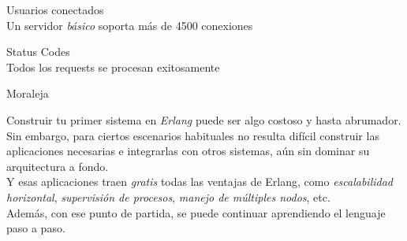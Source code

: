 \documentclass[utf8,hyperref={colorlinks=true}]{beamer}
\begin{document}
\begin{frame}[t]{Usuarios conectados}
 \\
Un servidor \emph{b\'asico} soporta m\'as de 4500 conexiones
\end{frame}

\begin{frame}[t]{Status Codes}
 \\
Todos los requests se procesan exitosamente
\end{frame}

\appendix

\begin{frame}{Moraleja}

	Construir tu primer sistema en \emph{Erlang} puede ser algo costoso y hasta abrumador. \pause Sin embargo, para ciertos escenarios habituales no resulta dif\'icil construir las aplicaciones necesarias e integrarlas con otros sistemas, a\'un sin dominar su arquitectura a fondo. \\
	\pause Y esas aplicaciones traen \emph{gratis} todas las ventajas de Erlang, como \emph{escalabilidad horizontal}, \emph{supervisi\'on de procesos}, \emph{manejo de m\'ultiples nodos}, etc. \\
	\pause Adem\'as, con ese punto de partida, se puede continuar aprendiendo el lenguaje paso a paso.
	
\end{frame}
\end{document}
